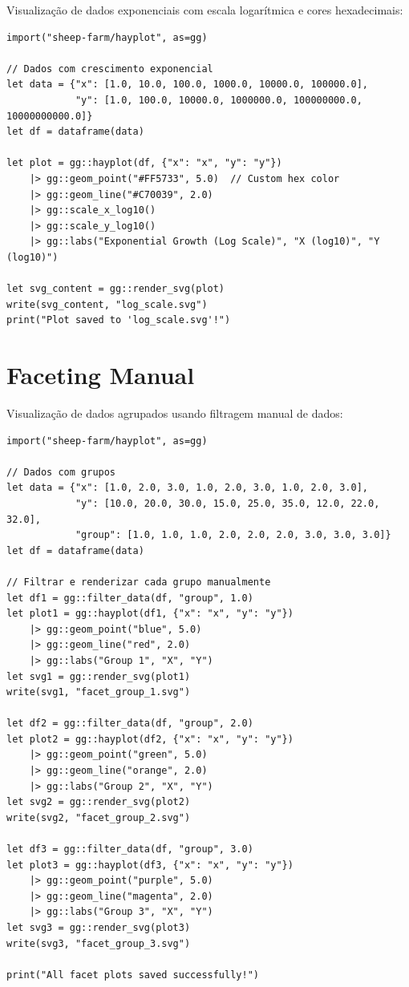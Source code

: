 \documentclass[12pt, a4paper, oneside]{book}
\begin{document}
Visualização de dados exponenciais com escala logarítmica e cores hexadecimais:

\begin{lstlisting}[caption={examples/log\_scale.hay}]
import("sheep-farm/hayplot", as=gg)

// Dados com crescimento exponencial
let data = {"x": [1.0, 10.0, 100.0, 1000.0, 10000.0, 100000.0],
            "y": [1.0, 100.0, 10000.0, 1000000.0, 100000000.0, 10000000000.0]}
let df = dataframe(data)

let plot = gg::hayplot(df, {"x": "x", "y": "y"})
    |> gg::geom_point("#FF5733", 5.0)  // Custom hex color
    |> gg::geom_line("#C70039", 2.0)
    |> gg::scale_x_log10()
    |> gg::scale_y_log10()
    |> gg::labs("Exponential Growth (Log Scale)", "X (log10)", "Y (log10)")

let svg_content = gg::render_svg(plot)
write(svg_content, "log_scale.svg")
print("Plot saved to 'log_scale.svg'!")
\end{lstlisting}

\section{Faceting Manual}

Visualização de dados agrupados usando filtragem manual de dados:

\begin{lstlisting}[caption={examples/filter\_facet.hay}]
import("sheep-farm/hayplot", as=gg)

// Dados com grupos
let data = {"x": [1.0, 2.0, 3.0, 1.0, 2.0, 3.0, 1.0, 2.0, 3.0],
            "y": [10.0, 20.0, 30.0, 15.0, 25.0, 35.0, 12.0, 22.0, 32.0],
            "group": [1.0, 1.0, 1.0, 2.0, 2.0, 2.0, 3.0, 3.0, 3.0]}
let df = dataframe(data)

// Filtrar e renderizar cada grupo manualmente
let df1 = gg::filter_data(df, "group", 1.0)
let plot1 = gg::hayplot(df1, {"x": "x", "y": "y"})
    |> gg::geom_point("blue", 5.0)
    |> gg::geom_line("red", 2.0)
    |> gg::labs("Group 1", "X", "Y")
let svg1 = gg::render_svg(plot1)
write(svg1, "facet_group_1.svg")

let df2 = gg::filter_data(df, "group", 2.0)
let plot2 = gg::hayplot(df2, {"x": "x", "y": "y"})
    |> gg::geom_point("green", 5.0)
    |> gg::geom_line("orange", 2.0)
    |> gg::labs("Group 2", "X", "Y")
let svg2 = gg::render_svg(plot2)
write(svg2, "facet_group_2.svg")

let df3 = gg::filter_data(df, "group", 3.0)
let plot3 = gg::hayplot(df3, {"x": "x", "y": "y"})
    |> gg::geom_point("purple", 5.0)
    |> gg::geom_line("magenta", 2.0)
    |> gg::labs("Group 3", "X", "Y")
let svg3 = gg::render_svg(plot3)
write(svg3, "facet_group_3.svg")

print("All facet plots saved successfully!")
\end{lstlisting}
\end{document}
